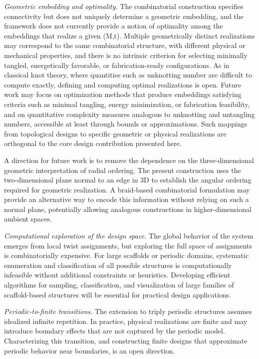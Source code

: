 \documentclass[acmtog]{acmart}
\begin{document}
\textit{Geometric embedding and optimality.} 
The combinatorial construction specifies connectivity but does not uniquely determine a geometric embedding, and the framework does not currently provide a notion of optimality among the embeddings that realize a given (M,t). Multiple geometrically distinct realizations may correspond to the same combinatorial structure, with different physical or mechanical properties, and there is no intrinsic criterion for selecting minimally tangled, energetically favorable, or fabrication-ready configurations. As in classical knot theory, where quantities such as unknotting number are difficult to compute exactly, defining and computing optimal realizations is open. Future work may focus on optimization methods that produce embeddings satisfying criteria such as minimal tangling, energy minimization, or fabrication feasibility, and on quantitative complexity measures analogous to unknotting and untangling numbers, accessible at least through bounds or approximations. Such mappings from topological designs to specific geometric or physical realizations are orthogonal to the core design contribution presented here.

A direction for future work is to remove the dependence on the three-dimensional geometric interpretation of radial ordering. The present construction uses the two-dimensional plane normal to an edge in 3D to establish the angular ordering required for geometric realization. A braid-based combinatorial formulation may provide an alternative way to encode this information without relying on such a normal plane, potentially allowing analogous constructions in higher-dimensional ambient spaces. 

\textit{Computational exploration of the design space.}
The global behavior of the system emerges from local twist assignments, but exploring the full space of assignments is combinatorially expensive. For large scaffolds or periodic domains, systematic enumeration and classification of all possible structures is computationally infeasible without additional constraints or heuristics. Developing efficient algorithms for sampling, classification, and visualization of large families of scaffold-based structures will be essential for practical design applications.

\textit{Periodic-to-finite transitions.}
The extension to triply periodic structures assumes idealized infinite repetition. In practice, physical realizations are finite and may introduce boundary effects that are not captured by the periodic model. Characterizing this transition, and constructing finite designs that approximate periodic behavior near boundaries, is an open direction.
\end{document}
